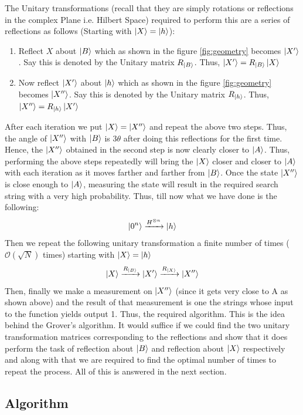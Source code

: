 The Unitary transformations (recall that they are simply rotations or reflections in the complex Plane i.e. Hilbert Space) required to perform this are a series of reflections as follows (Starting with $\ket{X}=\ket{h}$):
\begin{enumerate}
    \item Reflect $X$ about $\ket{B}$ which as shown in the figure \ref{fig:geometry} becomes $\ket{X'}$. Say this is denoted by the Unitary matrix $R_{\ket{B}}$. Thus, $\ket{X'}=R_{\ket{B}}\ket{X}$
    \item Now reflect $\ket{X'}$ about $\ket{h}$ which as shown in the figure \ref{fig:geometry} becomes $\ket{X''}$. Say this is denoted by the Unitary matrix $R_{\ket{h}}$. Thus, $\ket{X''}=R_{\ket{h}}\ket{X'}$
\end{enumerate}
After each iteration we put $\ket{X}=\ket{X''}$ and repeat the above two steps.
Thus, the angle of $\ket{X''}$ with $\ket{B}$ is $3\theta$ after doing this reflections for the first time.
Hence, the $\ket{X''}$ obtained in the second step is now clearly closer to $\ket{A}$. Thus, performing the above steps repeatedly will bring the $\ket{X}$ closer and closer to $\ket{A}$ with each iteration as it moves farther and farther from $\ket{B}$. Once the state $\ket{X''}$ is close enough to $\ket{A}$, measuring the state will result in the required search string with a very high probability.
Thus, till now what we have done is the following:
\[
\ket{0^n}\xrightarrow{H^{\otimes n}} \ket{h}
\]
Then we repeat the following unitary transformation a finite number of times ($\mathcal{O}(\sqrt{N})$ times) starting with $\ket{X}=\ket{h}$
\[
\ket{X} \xrightarrow{R_{\ket{B}}} \ket{X'} \xrightarrow{R_{\ket{X}}} \ket{X''}
\]
Then, finally we make a measurement on $\ket{X''}$ (since it gets very close to A as shown above) and the result of that measurement is one the strings whose input to the function yields output 1. Thus, the required algorithm. This is the idea behind the Grover's algorithm.
It would suffice if we could find the two unitary transformation matrices corresponding to the reflections and show that it does perform the task of reflection about $\ket{B}$ and reflection about $\ket{X}$ respectively and along with that we are required to find the optimal number of times to repeat the process. All of this is answered in the next section.

\subsection{Algorithm}
